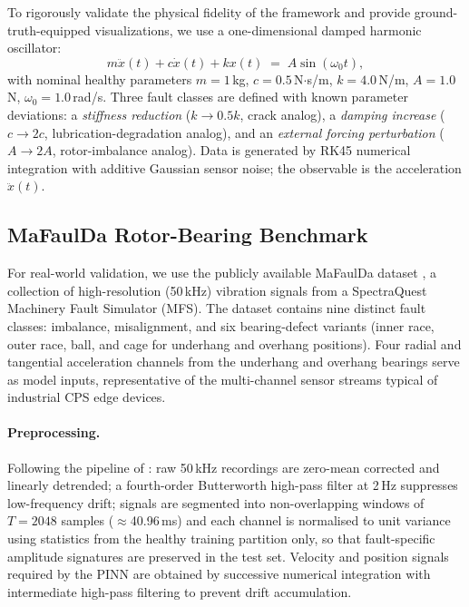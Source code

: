 \documentclass[conference]{IEEEtran}
\begin{document}
To rigorously validate the physical fidelity of the framework and provide ground-truth-equipped visualizations, we use a one-dimensional damped harmonic oscillator:
\begin{equation}
  m\ddot{x}(t) + c\dot{x}(t) + kx(t) \;=\; A\sin(\omega_0 t),
  \label{eq:oscillator}
\end{equation}
with nominal healthy parameters $m{=}1$\,kg, $c{=}0.5$\,N$\cdot$s/m, $k{=}4.0$\,N/m, $A{=}1.0$\,N, $\omega_0{=}1.0$\,rad/s. Three fault classes are defined with known parameter deviations: a \emph{stiffness reduction} ($k\to 0.5k$, crack analog), a \emph{damping increase} ($c\to 2c$, lubrication-degradation analog), and an \emph{external forcing perturbation} ($A\to 2A$, rotor-imbalance analog). Data is generated by RK45 numerical integration with additive Gaussian sensor noise; the observable is the acceleration $\ddot{x}(t)$.

\subsection{MaFaulDa Rotor-Bearing Benchmark}


For real-world validation, we use the publicly available MaFaulDa
dataset \cite{ribeiro2017mafaulda, spotorno2026linking}, a collection of high-resolution (50\,kHz) vibration signals from a SpectraQuest Machinery Fault Simulator (MFS). The dataset contains nine distinct fault classes: imbalance, misalignment, and six bearing-defect variants (inner race, outer race, ball, and cage for underhang and overhang positions). Four radial and tangential acceleration channels from the underhang and overhang bearings serve as model inputs, representative of the multi-channel sensor streams typical of industrial CPS edge devices.

\paragraph*{Preprocessing.}
Following the pipeline of \cite{spotorno2026linking}: raw 50\,kHz recordings are zero-mean corrected and linearly detrended; a fourth-order Butterworth high-pass filter at 2\,Hz suppresses low-frequency drift; signals are segmented into non-overlapping windows of $T\!=\!2048$ samples ($\approx$40.96\,ms) and each channel is normalised to unit variance using statistics from the healthy training partition only, so that fault-specific amplitude signatures are preserved in the test set. Velocity and position signals required by the PINN are obtained by successive numerical integration with intermediate high-pass filtering to prevent drift accumulation.
\end{document}
